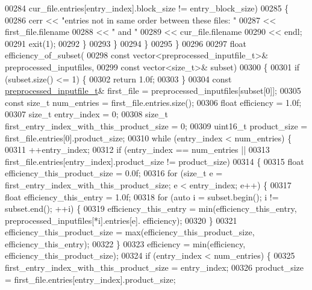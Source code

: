 \begin{DoxyCode}
{{00284           cur\_file.entries[entry\_index].block\_size != entry\_block\_size)
00285       \{
00286         cerr << \textcolor{stringliteral}{"entries not in same order between these files: "}
00287              << first\_file.filename
00288              << \textcolor{stringliteral}{" and "}
00289              << cur\_file.filename
00290              << endl;
00291         exit(1);
00292       \}
00293     \}
00294   \}
00295 \}
00296 
00297 \textcolor{keywordtype}{float} efficiency\_of\_subset(
00298         \textcolor{keyword}{const} vector<preprocessed\_inputfile\_t>& preprocessed\_inputfiles,
00299         \textcolor{keyword}{const} vector<size\_t>& subset)
00300 \{
00301   \textcolor{keywordflow}{if} (subset.size() <= 1) \{
00302     \textcolor{keywordflow}{return} 1.0f;
00303   \}
00304   \textcolor{keyword}{const} \hyperlink{structpreprocessed__inputfile__t}{preprocessed\_inputfile\_t}& first\_file = preprocessed\_inputfiles[subset[0]];
00305   \textcolor{keyword}{const} \textcolor{keywordtype}{size\_t} num\_entries = first\_file.entries.size();
00306   \textcolor{keywordtype}{float} efficiency = 1.0f;
00307   \textcolor{keywordtype}{size\_t} entry\_index = 0;
00308   \textcolor{keywordtype}{size\_t} first\_entry\_index\_with\_this\_product\_size = 0;
00309   uint16\_t product\_size = first\_file.entries[0].product\_size;
00310   \textcolor{keywordflow}{while} (entry\_index < num\_entries) \{
00311     ++entry\_index;
00312     \textcolor{keywordflow}{if} (entry\_index == num\_entries ||
00313         first\_file.entries[entry\_index].product\_size != product\_size)
00314     \{
00315       \textcolor{keywordtype}{float} efficiency\_this\_product\_size = 0.0f;
00316       \textcolor{keywordflow}{for} (\textcolor{keywordtype}{size\_t} e = first\_entry\_index\_with\_this\_product\_size; e < entry\_index; e++) \{
00317         \textcolor{keywordtype}{float} efficiency\_this\_entry = 1.0f;
00318         \textcolor{keywordflow}{for} (\textcolor{keyword}{auto} i = subset.begin(); i != subset.end(); ++i) \{
00319           efficiency\_this\_entry = min(efficiency\_this\_entry, preprocessed\_inputfiles[*i].entries[e].
      efficiency);
00320         \}
00321         efficiency\_this\_product\_size = max(efficiency\_this\_product\_size, efficiency\_this\_entry);
00322       \}
00323       efficiency = min(efficiency, efficiency\_this\_product\_size);
00324       \textcolor{keywordflow}{if} (entry\_index < num\_entries) \{
00325         first\_entry\_index\_with\_this\_product\_size = entry\_index;
00326         product\_size = first\_file.entries[entry\_index].product\_size;
}}
\end{DoxyCode}
